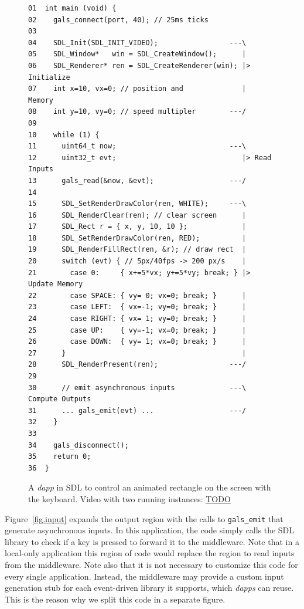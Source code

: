 \documentclass[sigplan,screen]{acmart}
\newcommand{\dapp}{\emph{dapp}\xspace}
\newcommand{\dapps}{\emph{dapps}\xspace}
\begin{document}
\begin{figure}[t]
{\scriptsize
\begin{verbatim}
01  int main (void) {
02    gals_connect(port, 40); // 25ms ticks
03
04    SDL_Init(SDL_INIT_VIDEO);                 ---\
05    SDL_Window*   win = SDL_CreateWindow();      |
06    SDL_Renderer* ren = SDL_CreateRenderer(win); |> Initialize
07    int x=10, vx=0; // position and              |    Memory
08    int y=10, vy=0; // speed multipler        ---/
09
10    while (1) {
11      uint64_t now;                           ---\
12      uint32_t evt;                              |> Read Inputs
13      gals_read(&now, &evt);                  ---/
14
15      SDL_SetRenderDrawColor(ren, WHITE);     ---\
16      SDL_RenderClear(ren); // clear screen      |
17      SDL_Rect r = { x, y, 10, 10 };             |
18      SDL_SetRenderDrawColor(ren, RED);          |
19      SDL_RenderFillRect(ren, &r); // draw rect  |
20      switch (evt) { // 5px/40fps -> 200 px/s    |
21        case 0:     { x+=5*vx; y+=5*vy; break; } |> Update Memory
22        case SPACE: { vy= 0; vx=0; break; }      |
23        case LEFT:  { vx=-1; vy=0; break; }      |
24        case RIGHT: { vx= 1; vy=0; break; }      |
25        case UP:    { vy=-1; vx=0; break; }      |
26        case DOWN:  { vy= 1; vx=0; break; }      |
27      }                                          |
28      SDL_RenderPresent(ren);                 ---/
29
30      // emit asynchronous inputs             ---\  Compute Outputs
31      ... gals_emit(evt) ...                  ---/
32    }
33
34    gals_disconnect();
35    return 0;
36  }
\end{verbatim}
}
  \caption{
    \label{fig.sdl}
    A \dapp in SDL to control an animated rectangle on the screen with the keyboard.
    Video with two running instances: \url{TODO}
  }
\end{figure}

Figure~\ref{fig.input} expands the output region with the calls to
\texttt{gals\_emit} that generate asynchronous inputs.
In this application, the code simply calls the SDL library to check if a key is
pressed to forward it to the middleware.
Note that in a local-only application this region of code would replace the
region to read inputs from the middleware.
Note also that it is not necessary to customize this code for every single
application.
Instead, the middleware may provide a custom input generation stub for each
event-driven library it supports, which \dapps can reuse.
This is the reason why we split this code in a separate figure.
\end{document}
